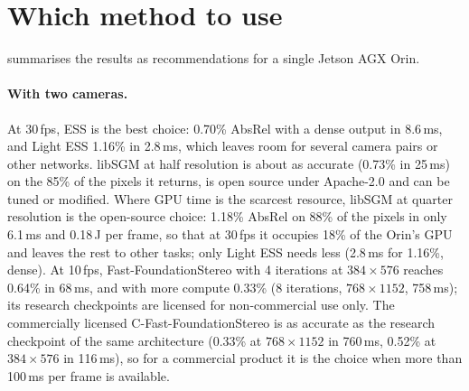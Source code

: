 \documentclass[10pt,twocolumn]{article}
\begin{document}
\section{Which method to use}
\label{sec:recommendations}

\begin{table}[!t]
\centering
\caption{Recommendations: the most accurate configuration whose GPU time on one Jetson AGX Orin (MAXN,
FP16) fits the frame-rate budget, by AbsRel on the non-occluded pixels of the 10 Middlebury 2014
scenes. Monocular models with the true focal length or intrinsics; the last column assumes the metric
scale is supplied by an oracle (an upper bound). Last row: the configuration with the lowest GPU time
among the methods whose licences permit commercial use and modification (libSGM, Depth Anything V2-S
and 3, MoGe-2, Metric3D v2). Licences in \cref{tab:res}.}
\label{tab:rec}
\small
\resizebox{\textwidth}{!}{}
\end{table}

 summarises the results as recommendations for a single Jetson AGX Orin.

\paragraph{With two cameras.} At 30\,fps, ESS is the best choice: 0.70\% AbsRel with a dense output in
8.6\,ms, and Light ESS 1.16\% in 2.8\,ms, which leaves room for several camera pairs or other networks.
libSGM at half resolution is about as accurate (0.73\% in 25\,ms) on the 85\% of the pixels it returns,
is open source under Apache-2.0 and can be tuned or modified. Where GPU time is the scarcest resource,
libSGM at quarter resolution is the open-source choice: 1.18\% AbsRel on 88\% of the pixels in only
6.1\,ms and 0.18\,J per frame, so that at 30\,fps it occupies 18\% of the Orin's GPU and leaves the rest to
other tasks; only Light ESS needs less (2.8\,ms for 1.16\%, dense). At 10\,fps, Fast-FoundationStereo with 4
iterations at $384\times576$ reaches 0.64\% in 68\,ms, and with more compute 0.33\% (8 iterations,
$768\times1152$, 758\,ms); its research checkpoints are licensed for non-commercial use only. The
commercially licensed C-Fast-FoundationStereo is as accurate as the research checkpoint of the same
architecture (0.33\% at $768\times1152$ in 760\,ms, 0.52\% at $384\times576$ in 116\,ms), so for a
commercial product it is the choice when more than 100\,ms per frame is available.
\end{document}
